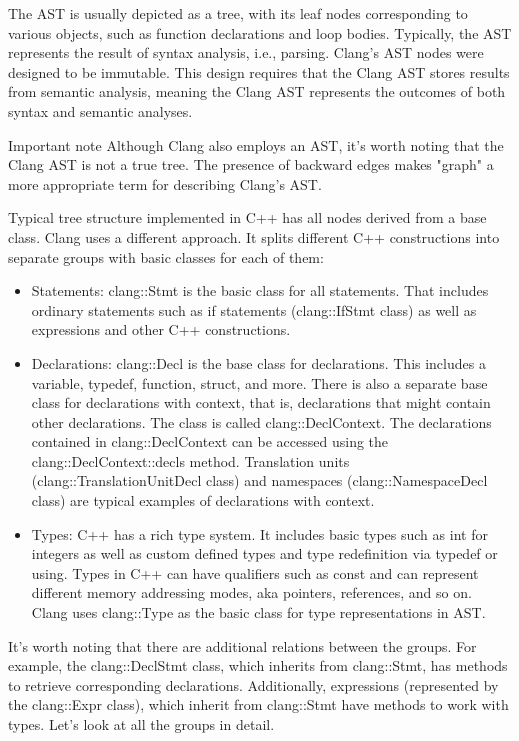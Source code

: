 The AST is usually depicted as a tree, with its leaf nodes corresponding to various objects, such as function declarations and loop bodies. Typically, the AST represents the result of syntax analysis, i.e., parsing. Clang's AST nodes were designed to be immutable. This design requires that the Clang AST stores results from semantic analysis, meaning the Clang AST represents the outcomes of both syntax and semantic analyses.

\begin{myNotic}{Important note}
Although Clang also employs an AST, it's worth noting that the Clang AST is not a true tree. The presence of backward edges makes "graph" a more appropriate term for describing Clang's AST.
\end{myNotic}

Typical tree structure implemented in C++ has all nodes derived from a base class. Clang uses a different approach. It splits different C++ constructions into separate groups with basic classes for each of them:

\begin{itemize}
\item
Statements: clang::Stmt is the basic class for all statements. That includes ordinary statements such as if statements (clang::IfStmt class) as well as expressions and other C++ constructions.

\item
Declarations: clang::Decl is the base class for declarations. This includes a variable, typedef, function, struct, and more. There is also a separate base class for declarations with context, that is, declarations that might contain other declarations. The class is called clang::DeclContext. The declarations contained in clang::DeclContext can be accessed using the clang::DeclContext::decls method. Translation units (clang::TranslationUnitDecl class) and namespaces (clang::NamespaceDecl class) are typical examples of declarations with context.

\item
Types: C++ has a rich type system. It includes basic types such as int for integers as well as custom defined types and type redefinition via typedef or using. Types in C++ can have qualifiers such as const and can represent different memory addressing modes, aka pointers, references, and so on. Clang uses clang::Type as the basic class for type representations in AST.
\end{itemize}

It's worth noting that there are additional relations between the groups. For example, the clang::DeclStmt class, which inherits from clang::Stmt, has methods to retrieve corresponding declarations. Additionally, expressions (represented by the clang::Expr class), which inherit from clang::Stmt have methods to work with types. Let's look at all the groups in detail.

